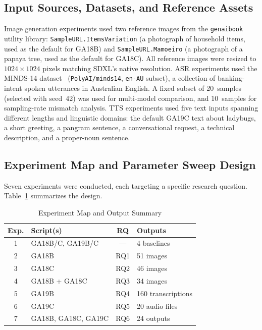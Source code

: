 \documentclass[conference]{IEEEtran}
\newcommand{\sdxl}{SDXL}
\begin{document}
\subsection{Input Sources, Datasets, and Reference Assets}

Image generation experiments used two reference images from the \texttt{genaibook} utility library: \texttt{SampleURL.ItemsVariation} (a photograph of household items, used as the default for GA18B) and \texttt{SampleURL.Mamoeiro} (a photograph of a papaya tree, used as the default for GA18C). All reference images were resized to \(1024 \times 1024\) pixels matching \sdxl{}'s native resolution. ASR experiments used the MINDS-14 dataset~\cite{gerz2021minds14} (\texttt{PolyAI/minds14}, \texttt{en-AU} subset), a collection of banking-intent spoken utterances in Australian English. A fixed subset of 20~samples (selected with seed~42) was used for multi-model comparison, and 10~samples for sampling-rate mismatch analysis. TTS experiments used five text inputs spanning different lengths and linguistic domains: the default GA19C text about ladybugs, a short greeting, a pangram sentence, a conversational request, a technical description, and a proper-noun sentence.

\subsection{Experiment Map and Parameter Sweep Design}

Seven experiments were conducted, each targeting a specific research question. Table~\ref{tab:expmap} summarizes the design.

\begin{table}[htbp]
\caption{Experiment Map and Output Summary}
\label{tab:expmap}
\centering
\footnotesize
\begin{tabular}{@{}clcl@{}}
\toprule
\textbf{Exp.} & \textbf{Script(s)} & \textbf{RQ} & \textbf{Outputs} \\
\midrule
1 & GA18B/C, GA19B/C & --- & 4 baselines \\
2 & GA18B & RQ1 & 51 images \\
3 & GA18C & RQ2 & 46 images \\
4 & GA18B + GA18C & RQ3 & 34 images \\
5 & GA19B & RQ4 & 160 transcriptions \\
6 & GA19C & RQ5 & 20 audio files \\
7 & GA18B, GA18C, GA19C & RQ6 & 24 outputs \\
\bottomrule
\end{tabular}
\end{table}
\end{document}
